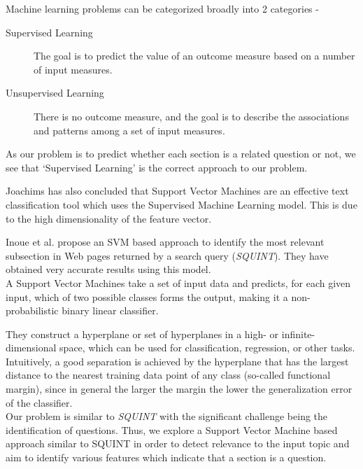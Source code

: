 \documentclass[10pt,a4paper]{report}
\begin{document}
Machine learning problems can be categorized broadly into 2 categories\cite{elements} -

\begin{description}
	\item[Supervised Learning] The goal is to predict the value of an outcome measure based on a number of input measures.
	\item[Unsupervised Learning] There is no outcome measure, and the goal is to describe the associations and patterns among a set of input measures.
\end{description}

As our problem is to predict whether each section is a related question or not, we see that `Supervised Learning' is the correct approach to our problem.

Joachims has also concluded\cite{joachims} that Support Vector Machines are an effective text classification tool which uses the Supervised Machine Learning model. This is due to the high dimensionality of the feature vector.\cite{squint}

Inoue et al.\cite{squint} propose an SVM based approach to identify the most relevant subsection in Web pages returned by a search query (\textit{SQUINT}). They have obtained very accurate results using this model. \\

A Support Vector Machines take a set of input data and predicts, for each given input, which of two possible classes forms the output, making it a non-probabilistic binary linear classifier. 

They construct a hyperplane or set of hyperplanes in a high- or infinite-dimensional space, which can be used for classification, regression, or other tasks. Intuitively, a good separation is achieved by the hyperplane that has the largest distance to the nearest training data point of any class (so-called functional margin), since in general the larger the margin the lower the generalization error of the classifier.\cite{wikiSVM} \\

Our problem is similar to \textit{SQUINT} with the significant challenge being the identification of questions. Thus, we explore a Support Vector Machine based approach similar to SQUINT in order to detect relevance to the input topic and aim to identify various features which indicate that a section is a question.

\end{document}
